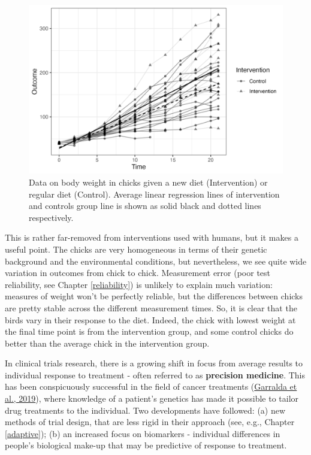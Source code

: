 \documentclass{krantz}
\begin{document}
\begin{center}
\begin{figure}
\includegraphics[width=0.75\linewidth]{images_bw/interventionhet} \caption{Data on body weight in chicks given a new diet (Intervention) or regular diet (Control). Average linear regression lines of intervention and controls group line is shown as solid black and dotted lines respectively.}\label{fig:interventionhet}
\end{figure}
\end{center}

This is rather far-removed from interventions used with humans, but it makes a useful point. The chicks are very homogeneous in terms of their genetic background and the environmental conditions, but nevertheless, we see quite wide variation in outcomes from chick to chick. Measurement error (poor test reliability, see Chapter \ref{reliability}) is unlikely to explain much variation: measures of weight won't be perfectly reliable, but the differences between chicks are pretty stable across the different measurement times. So, it is clear that the birds vary in their response to the diet. Indeed, the chick with lowest weight at the final time point is from the intervention group, and some control chicks do better than the average chick in the intervention group.

In clinical trials research, there is a growing shift in focus from average results to individual response to treatment - often referred to as \textbf{precision medicine}. This has been conspicuously successful in the field of cancer treatments (\protect\hyperlink{ref-garralda2019}{Garralda et al., 2019}), where knowledge of a patient's genetics has made it possible to tailor drug treatments to the individual. Two developments have followed: (a) new methods of trial design, that are less rigid in their approach (see, e.g., Chapter \ref{adaptive}); (b) an increased focus on biomarkers - individual differences in people's biological make-up that may be predictive of response to treatment.
\end{document}
